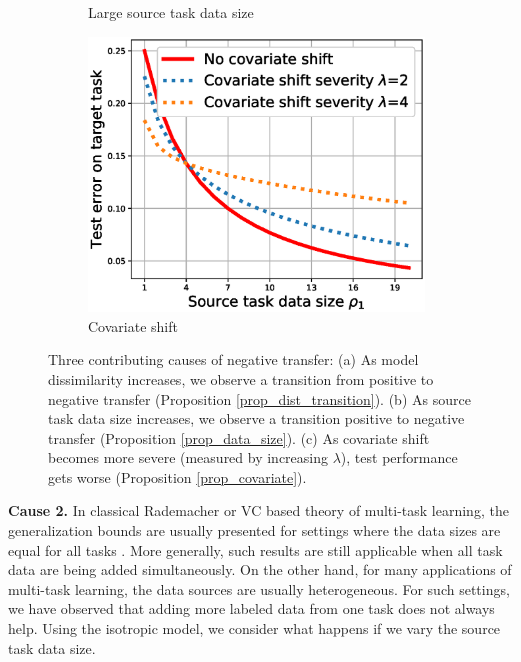 \begin{figure}
\begin{subfigure}[b]{0.32\textwidth}
		\caption{Large source task data size}
	\end{subfigure}\hfill
	\begin{subfigure}[b]{0.32\textwidth}
		\centering
		\includegraphics[width=0.98\textwidth]{figures/complementary.eps}
		\caption{Covariate shift}
		\label{fig_covariate}
	\end{subfigure}
	\caption{Three contributing causes of negative transfer:
	(a) As model dissimilarity increases, we observe a transition from positive to negative transfer  (Proposition \ref{prop_dist_transition}).
	(b) As source task data size increases, we observe a transition positive to negative transfer (Proposition \ref{prop_data_size}).
	(c) As covariate shift becomes more severe (measured by increasing $\lambda$), test performance gets worse (Proposition \ref{prop_covariate}).}
	\label{fig_model_shift_phasetrans}
\end{figure}

\textbf{Cause 2.}
In classical Rademacher or VC based theory of multi-task learning, the generalization bounds are usually presented for settings where the data sizes are equal for all tasks \cite{B00,M06,MPR16}.
More generally, such results are still applicable when all task data are being added simultaneously.
On the other hand, for many applications of multi-task learning, the data sources are usually heterogeneous.
For such settings, we have observed that adding more labeled data from one task does not always help.
Using the isotropic model, we consider what happens if we vary the source task data size.

